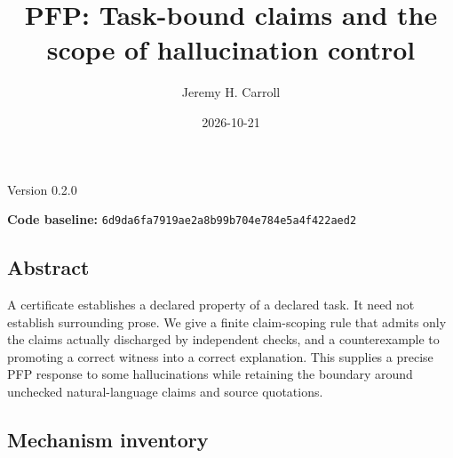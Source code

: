 \documentclass[
  11pt,
]{article}
\title{PFP: Task-bound claims and the scope of hallucination control}
\author{Jeremy H. Carroll}
\date{2026-10-21}
\begin{document}
\makeatletter
\begin{center}
{\LARGE \@title\par}
\vspace{0.8em}
{\normalsize \@author\par}
\vspace{0.5em}
{\small \@date\par}
{\small Version 0.2.0\par}
\end{center}
\makeatother

\textbf{Code baseline:}
\nolinkurl{6d9da6fa7919ae2a8b99b704e784e5a4f422aed2}

\subsection{Abstract}\label{abstract}

A certificate establishes a declared property of a declared task. It
need not establish surrounding prose. We give a finite claim-scoping
rule that admits only the claims actually discharged by independent
checks, and a counterexample to promoting a correct witness into a
correct explanation. This supplies a precise PFP response to some
hallucinations while retaining the boundary around unchecked
natural-language claims and source quotations.

\subsection{Mechanism inventory}\label{mechanism-inventory}
\end{document}
